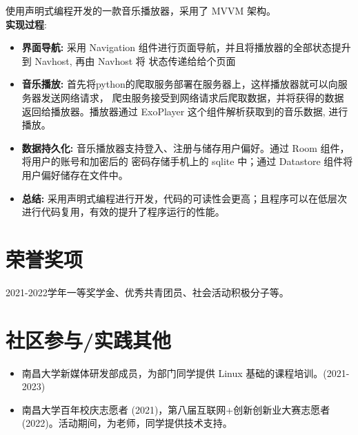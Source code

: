 \documentclass{resume}
\begin{document}
  使用声明式编程开发的一款音乐播放器，采用了 MVVM 架构。 
 \\   \textbf{实现过程}:  
\begin{itemize}
  \item \textbf{界面导航: } 采用 Navigation 组件进行页面导航，并且将播放器的全部状态提升到 Navhost, 再由 Navhost 将
  状态传递给给个页面
  \item \textbf{音乐播放: } 首先将python的爬取服务部署在服务器上，这样播放器就可以向服务器发送网络请求，
    爬虫服务接受到网络请求后爬取数据，并将获得的数据返回给播放器。播放器通过 ExoPlayer 这个组件解析获取到的音乐数据,
    进行播放。
  \item \textbf{数据持久化: } 音乐播放器支持登入、注册与储存用户偏好。通过 Room 组件，将用户的账号和加密后的
  密码存储手机上的 sqlite 中；通过 Datastore 组件将用户偏好储存在文件中。
  \item \textbf{总结: } 采用声明式编程进行开发，代码的可读性会更高；且程序可以在低层次进行代码复用，有效的提升了程序运行的性能。
\end{itemize}

\section{荣誉奖项}
2021-2022学年一等奖学金、优秀共青团员、社会活动积极分子等。

\section{社区参与/实践其他}
\begin{itemize}[parsep=0.2ex]
  \item 南昌大学新媒体研发部成员，为部门同学提供 Linux 基础的课程培训。(2021-2023)
  \item 南昌大学百年校庆志愿者 (2021)，第八届互联网+创新创新业大赛志愿者(2022)。活动期间，为老师，同学提供技术支持。
\end{itemize}
\end{document}
